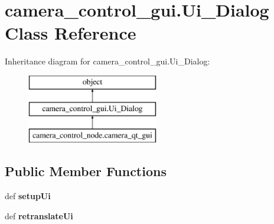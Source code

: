 \hypertarget{classcamera__control__gui_1_1Ui__Dialog}{\section{camera\-\_\-control\-\_\-gui.\-Ui\-\_\-\-Dialog Class Reference}
\label{classcamera__control__gui_1_1Ui__Dialog}
}
Inheritance diagram for camera\-\_\-control\-\_\-gui.\-Ui\-\_\-\-Dialog\-:\begin{figure}[H]
\begin{center}
\leavevmode
\includegraphics[height=3.000000cm]{classcamera__control__gui_1_1Ui__Dialog}
\end{center}
\end{figure}
\subsection*{Public Member Functions}
\begin{DoxyCompactItemize}
\item 
\hypertarget{classcamera__control__gui_1_1Ui__Dialog_a636de533420a3fed567c7842a5ff2a60}{def {\bfseries setup\-Ui}}\label{classcamera__control__gui_1_1Ui__Dialog_a636de533420a3fed567c7842a5ff2a60}

\item 
\hypertarget{classcamera__control__gui_1_1Ui__Dialog_a9fa49ed45b992f6c267793dc7859f7c9}{def {\bfseries retranslate\-Ui}}\label{classcamera__control__gui_1_1Ui__Dialog_a9fa49ed45b992f6c267793dc7859f7c9}

\end{DoxyCompactItemize}
